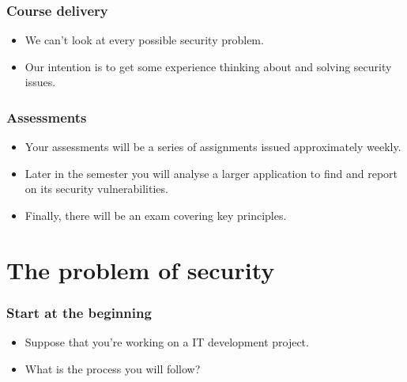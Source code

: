 \documentclass[10pt]{beamer}
\begin{document}
\begin{frame}
	\frametitle{Course delivery}

	\begin{itemize}
		\item We can't look at every possible security problem.
		\item Our intention is to get some experience thinking about
			and solving security issues.
	\end{itemize}
\end{frame}

\begin{frame}
	\frametitle{Assessments}

	\begin{itemize}
		\item Your assessments will be a series of assignments issued 
			approximately weekly.
			\item Later in the semester you will analyse a larger application to find and report on its security vulnerabilities.
			\item Finally, there will be an exam covering key principles.
	
	\end{itemize}
\end{frame}

\section{The problem of security}

\begin{frame}
    \frametitle{Start at the beginning}
    \begin{itemize}
	    \item Suppose that you're working on a IT development project.
	    \item What is the process you will follow?
    \end{itemize}
\end{frame}
\end{document}
